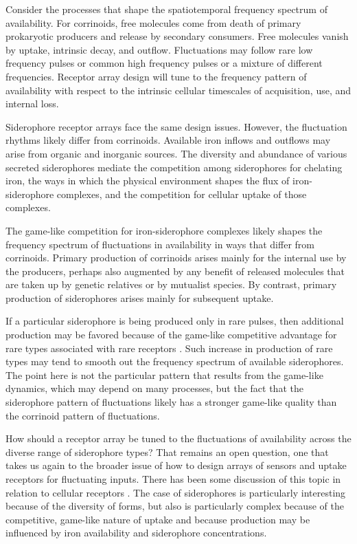 \documentclass[\mydocfontsize]{article}
\begin{document}
\begin{multicols}{2}
Consider the processes that shape the spatiotemporal frequency spectrum of availability. For corrinoids, free molecules come from death of primary prokaryotic producers and release by secondary consumers. Free molecules vanish by uptake, intrinsic decay, and outflow. Fluctuations may follow rare low frequency pulses or common high frequency pulses or a mixture of different frequencies. Receptor array design will tune to the frequency pattern of availability with respect to the intrinsic cellular timescales of acquisition, use, and internal loss.

Siderophore receptor arrays face the same design issues. However, the fluctuation rhythms likely differ from corrinoids. Available iron inflows and outflows may arise from organic and inorganic sources. The diversity and abundance of various secreted siderophores mediate the competition among siderophores for chelating iron, the ways in which the physical environment shapes the flux of iron-siderophore complexes, and the competition for cellular uptake of those complexes. 

The game-like competition for iron-siderophore complexes likely shapes the frequency spectrum of fluctuations in availability in ways that differ from corrinoids. Primary production of corrinoids arises mainly for the internal use by the producers, perhaps also augmented by any benefit of released molecules that are taken up by genetic relatives or by mutualist species. By contrast, primary production of siderophores arises mainly for subsequent uptake.

If a particular siderophore is being produced only in rare pulses, then additional production may be favored because of the game-like competitive advantage for rare types associated with rare receptors \autocite{lee12an-evolutionary,inglis16presence}. Such increase in production of rare types may tend to smooth out the frequency spectrum of available siderophores. The point here is not the particular pattern that results from the game-like dynamics, which may depend on many processes, but the fact that the siderophore pattern of fluctuations likely has a stronger game-like quality than the corrinoid pattern of fluctuations. 

How should a receptor array be tuned to the fluctuations of availability across the diverse range of siderophore types? That remains an open question, one that takes us again to the broader issue of how to design arrays of sensors and uptake receptors for fluctuating inputs. There has been some discussion of this topic in relation to cellular receptors \autocite{hasty10systems}. The case of siderophores is particularly interesting because of the diversity of forms, but also is particularly complex because of the competitive, game-like nature of uptake and because production may be influenced by iron availability and siderophore concentrations.


\end{multicols}
\end{document}
